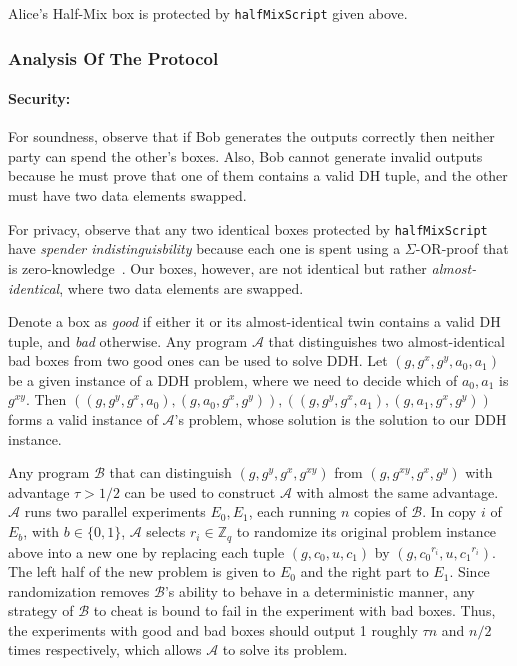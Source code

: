 \documentclass[11pt]{article}
\begin{document}
Alice's Half-Mix box is protected by \texttt{halfMixScript} given above.
\subsubsection{Analysis Of The Protocol}
\paragraph{Security:} For soundness, observe that if Bob generates the outputs correctly then neither party can spend the other's boxes. Also, Bob cannot generate invalid outputs because he must prove that one of them contains a valid DH tuple, and the other must have two data elements swapped. 

For privacy, observe that any two identical boxes protected by \texttt{halfMixScript} have {\em spender indistinguisbility} because each one is spent using a $\Sigma$-OR-proof that is zero-knowledge~\cite{Dam10}. Our boxes, however, are not identical but rather {\em almost-identical}, where two data elements are swapped. 

Denote a box as {\em good} if either it or its almost-identical twin contains a valid DH tuple, and {\em bad} otherwise. Any program $\mathcal{A}$ that distinguishes two almost-identical bad boxes from two good ones can be used to solve DDH. Let $(g, g^x, g^y, a_0, a_1)$ be a given instance of a DDH problem, where we need to decide which of $a_0, a_1$ is $g^{xy}$. 
Then $((g, g^y, g^x, a_0), (g, a_0, g^x, g^y)), ((g, g^y, g^x, a_1), (g, a_1, g^x, g^y))$ forms a valid instance of $\mathcal{A}$'s problem, whose solution is the solution to our DDH instance. 

Any program $\mathcal{B}$ that can distinguish $(g, g^y, g^x, g^{xy})$ from $(g, g^{xy}, g^x, g^y)$ with advantage $\tau > 1/2$ can be used to construct $\mathcal{A}$ with almost the same advantage. $\mathcal{A}$ runs two parallel experiments $E_0, E_1$, each running $n$ copies of $\mathcal{B}$. In copy $i$ of $E_b$, with $b\in\{0, 1\}$, $\mathcal{A}$ selects $r_i \in \mathbb{Z}_q$ to randomize its original problem instance above into a new one by replacing each tuple $(g, c_0, u, c_1)$ by $(g, {c_0}^{r_i}, u, {c_1}^{r_i})$. The left half of the new problem is given to $E_0$ and the right part to $E_1$. Since randomization removes $\mathcal{B}$'s ability to behave in a deterministic manner, any strategy of  $\mathcal{B}$ to cheat is bound to fail in the experiment with bad boxes. Thus, the experiments with good and bad boxes should output 1 roughly $\tau n$ and $n/2$ times respectively, which allows $\mathcal{A}$ to solve its problem. 
\end{document}
